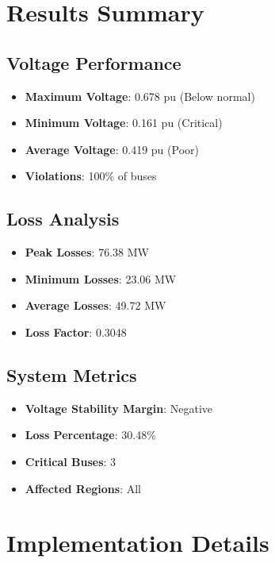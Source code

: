 \documentclass[11pt]{article}
\begin{document}
\section{Results Summary}

\subsection{Voltage Performance}
\begin{itemize}
    \item \textbf{Maximum Voltage}: 0.678 pu (Below normal)
    \item \textbf{Minimum Voltage}: 0.161 pu (Critical)
    \item \textbf{Average Voltage}: 0.419 pu (Poor)
    \item \textbf{Violations}: 100\% of buses
\end{itemize}

\subsection{Loss Analysis}
\begin{itemize}
    \item \textbf{Peak Losses}: 76.38 MW
    \item \textbf{Minimum Losses}: 23.06 MW
    \item \textbf{Average Losses}: 49.72 MW
    \item \textbf{Loss Factor}: 0.3048
\end{itemize}

\subsection{System Metrics}
\begin{itemize}
    \item \textbf{Voltage Stability Margin}: Negative
    \item \textbf{Loss Percentage}: 30.48\%
    \item \textbf{Critical Buses}: 3
    \item \textbf{Affected Regions}: All
\end{itemize}

\section{Implementation Details}
\end{document}
